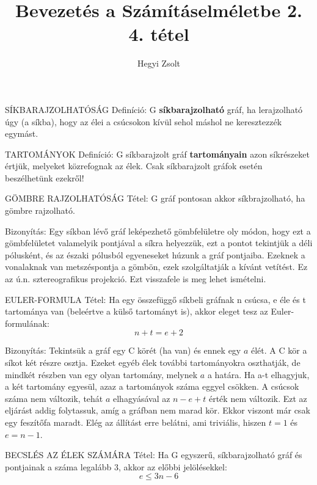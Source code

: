 \documentclass[]{article}
\title{Bevezetés a Számításelméletbe 2.\\{\large 4. tétel}}
\author{Hegyi Zsolt}
\begin{document}
\maketitle
\begin{shaded}
SÍKBARAJZOLHATÓSÁG Definíció: G \textbf{síkbarajzolható} gráf, ha lerajzolható úgy (a síkba), hogy az élei a csúcsokon kívül sehol máshol ne keresztezzék egymást.
\end{shaded}
\begin{shaded}
TARTOMÁNYOK Definíció: G síkbarajzolt gráf \textbf{tartományain} azon síkrészeket értjük, melyeket közrefognak az élek. Csak síkbarajzolt gráfok esetén beszélhetünk ezekről!
\end{shaded}
\begin{framed}
GÖMBRE RAJZOLHATÓSÁG Tétel: G gráf pontosan akkor síkbrajzolható, ha gömbre rajzolható.
\end{framed}
\begin{leftbar}
Bizonyítás: Egy síkban lévő gráf leképezhető gömbfelületre oly módon, hogy ezt a gömbfelületet valamelyik pontjával a síkra helyezzük, ezt a pontot tekintjük a déli pólusként, és az északi pólusból egyeneseket húzunk a gráf pontjaiba. Ezeknek a vonalaknak van metszéspontja a gömbön, ezek szolgáltatják a kívánt vetítést. Ez az ú.n. sztereografikus projekció. Ezt visszafele is meg lehet ismételni.
\end{leftbar}
\begin{framed}
EULER-FORMULA Tétel: Ha egy összefüggő síkbeli gráfnak n csúcsa, e éle és t tartománya van (beleértve a külső tartományt is), akkor eleget tesz az Euler-formulának:
$$n + t = e + 2$$
\end{framed}
\begin{leftbar}
Bizonyítás: Tekintsük a gráf egy C körét (ha van) és ennek egy $a$ élét. A C kör a síkot két részre osztja. Ezeket egyéb élek további tartományokra oszthatják, de mindkét részben van egy olyan tartomány, melynek $a$ a határa. Ha a-t elhagyjuk, a két tartomány egyesül, azaz a tartományok száma eggyel csökken. A csúcsok száma nem változik, tehát $a$ elhagyásával az $n - e + t$ érték nem változik. Ezt az eljárást addig folytassuk, amíg a gráfban nem marad kör. Ekkor viszont már csak egy feszítőfa maradt. Elég az állítást erre belátni, ami triviális, hiszen $t = 1$ és $e = n - 1$.
\end{leftbar}
\begin{framed}
BECSLÉS AZ ÉLEK SZÁMÁRA Tétel: Ha G egyszerű, síkbarajzolható gráf és pontjainak a száma legalább 3, akkor az előbbi jelölésekkel:
$$e \leq 3n - 6$$ 
\end{framed}
\end{document}
